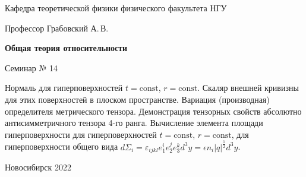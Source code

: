 \documentclass[12pt,pagesize,paper=192mm:108mm,landscape]{scrbook}
\begin{document}
\begin{titlepage}
\begin{center}
    Кафедра теоретической физики физического факультета НГУ

    \Large
    Профессор Грабовский А.\,В.

    \huge
    \textbf{Общая теория относительности}

    \Large
    Семинар № 14
    \vfill

    \normalsize
    \begin{minipage}{0.85\linewidth}
      Нормаль для гиперповерхностей $t =\text{const}$, $r =\text{const}$. Скаляр
      внешней кривизны для этих поверхностей в плоском
      пространстве. Вариация (производная) определителя метрического
      тензора. Демонстрация тензорных свойств абсолютно
      антисимметричного тензора 4-го ранга. Вычисление элемента
      площади гиперповерхности для гиперповерхностей $t=\text{const}$,
      $r=\text{const}$, для гиперповерхности общего вида
      $d\Sigma_i = \varepsilon_{ijkl}e_1^ie_2^je_3^k d^3y
      = \epsilon n_i\left|q\right|^\frac{1}{2} d^3y$.
    \end{minipage}
    \vfill

    \normalsize \ccbysa\hspace{0.5em}  Новосибирск 2022
  \end{center}
\end{titlepage}
\end{document}
